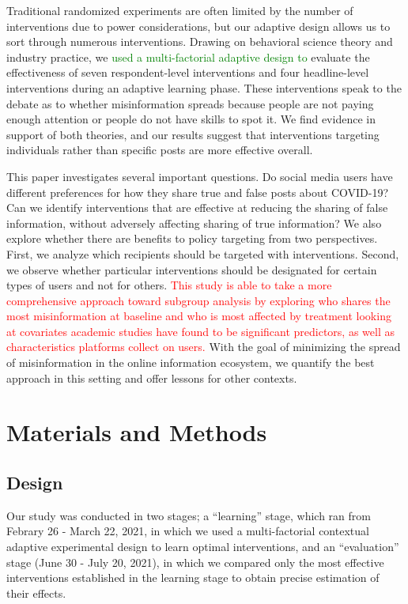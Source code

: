 \documentclass[letterpaper, 12pt, parskip=full,DIV=10]{scrartcl}
\begin{document}
Traditional randomized experiments are often limited by the number of interventions due to power considerations, but our adaptive design allows us to sort through numerous interventions.  Drawing on behavioral science theory and industry practice, we \textcolor{green}{used a multi-factorial adaptive design to} evaluate the effectiveness of seven respondent-level interventions and four headline-level interventions during an adaptive learning phase. These interventions speak to the debate as to whether misinformation spreads because people are not paying enough attention or people do not have skills to spot it.  We find evidence in support of both theories, and our results suggest that interventions targeting individuals rather than specific posts are more effective overall. 


This paper investigates several important questions.  Do social media users have different preferences for how they share true and false posts about COVID-19? Can we identify interventions that are effective at reducing the sharing of false information, without adversely affecting sharing of true information? We also explore whether there are benefits to policy targeting from two perspectives. First, we analyze which recipients should be targeted with interventions. Second, we observe whether particular interventions should be designated for certain types of users and not for others.  \textcolor{red}{This study is able to take a more comprehensive approach toward subgroup analysis by exploring who shares the most misinformation at baseline and who is most affected by treatment looking at covariates academic studies have found to be significant predictors, as well as characteristics platforms collect on users. }With the goal of minimizing the spread of misinformation in the online information ecosystem, we quantify the best approach in this setting and offer lessons for other contexts.



\section{Materials and Methods}
\subsection{Design}
Our study was conducted in two stages; a ``learning'' stage, which ran from Febrary 26 - March 22, 2021, in which we used a multi-factorial contextual adaptive experimental design to learn optimal interventions, and an ``evaluation'' stage (June 30 - July 20, 2021), in which we compared only the most effective interventions established in the learning stage to obtain precise estimation of their effects. 
\end{document}
